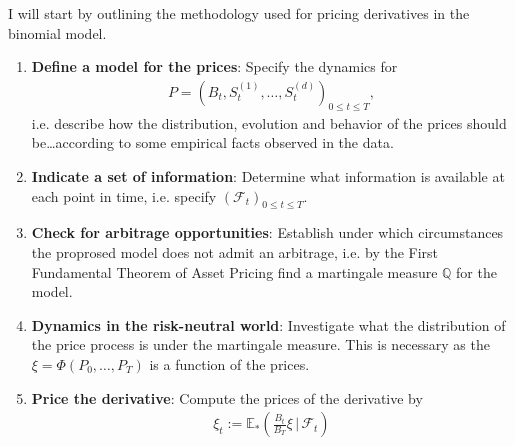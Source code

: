 \documentclass{beamer}
\numberwithin{equation}{section}
\begin{document}
\begin{frame}\frametitle{{\normalsize \secname} \\ {\large \subsecname}}
    I will start by outlining the methodology used for pricing derivatives in the binomial model.
    \begingroup
    \footnotesize
    \begin{enumerate}
        \item \textbf{Define a model for the prices}: Specify the dynamics for
        \begin{align}
            P = 
            \left(
                B_t, S_t^{(1)}, \ldots, S_t^{(d)}
            \right)_{0 \leq t \leq T},
        \end{align}
        i.e. describe how the distribution, evolution and behavior of the prices should be\dots according to some empirical facts observed in the data.
        \item \textbf{Indicate a set of information}: Determine what information is available at each point in time, i.e. specify $\left(\mathscr{F}_t\right)_{0 \leq t \leq T}$.
        \item \textbf{Check for arbitrage opportunities}: Establish under which circumstances the proprosed model does not admit an arbitrage, i.e. by the First Fundamental Theorem of Asset Pricing find a martingale measure $\mathbb{Q}$ for the model.
        \item \textbf{Dynamics in the risk-neutral world}: Investigate what the distribution of the price process is under the martingale measure.
        This is necessary as the $\xi = \Phi(P_0, \dots, P_T)$ is a function of the prices.
        \item \textbf{Price the derivative}: Compute the prices of the derivative by
        \begin{align}
            \xi_t := \mathbb{E}_*\left(\frac{B_t}{B_T}\xi \, \bigg| \, \mathscr{F}_t\right)
        \end{align}
    \end{enumerate}
    \endgroup
\end{frame}

\end{document}
